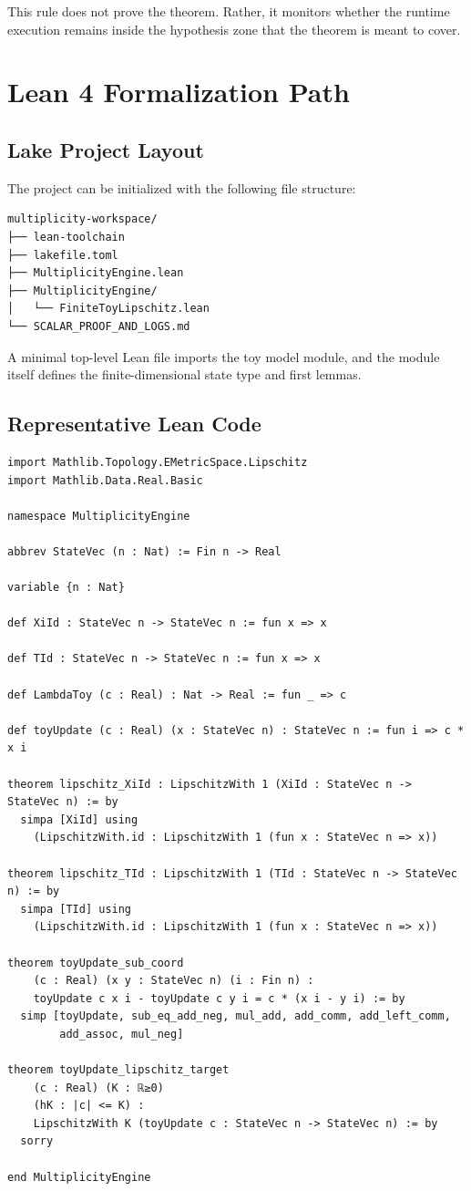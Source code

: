 \documentclass[11pt]{article}
\begin{document}
This rule does not prove the theorem. Rather, it monitors whether the runtime execution remains inside the hypothesis zone that the theorem is meant to cover.

\section{Lean 4 Formalization Path}

\subsection{Lake Project Layout}
The project can be initialized with the following file structure:
\begin{verbatim}
multiplicity-workspace/
├── lean-toolchain
├── lakefile.toml
├── MultiplicityEngine.lean
├── MultiplicityEngine/
│   └── FiniteToyLipschitz.lean
└── SCALAR_PROOF_AND_LOGS.md
\end{verbatim}

A minimal top-level Lean file imports the toy model module, and the module itself defines the finite-dimensional state type and first lemmas.

\subsection{Representative Lean Code}
\begin{verbatim}
import Mathlib.Topology.EMetricSpace.Lipschitz
import Mathlib.Data.Real.Basic

namespace MultiplicityEngine

abbrev StateVec (n : Nat) := Fin n -> Real

variable {n : Nat}

def XiId : StateVec n -> StateVec n := fun x => x

def TId : StateVec n -> StateVec n := fun x => x

def LambdaToy (c : Real) : Nat -> Real := fun _ => c

def toyUpdate (c : Real) (x : StateVec n) : StateVec n := fun i => c * x i

theorem lipschitz_XiId : LipschitzWith 1 (XiId : StateVec n -> StateVec n) := by
  simpa [XiId] using
    (LipschitzWith.id : LipschitzWith 1 (fun x : StateVec n => x))

theorem lipschitz_TId : LipschitzWith 1 (TId : StateVec n -> StateVec n) := by
  simpa [TId] using
    (LipschitzWith.id : LipschitzWith 1 (fun x : StateVec n => x))

theorem toyUpdate_sub_coord
    (c : Real) (x y : StateVec n) (i : Fin n) :
    toyUpdate c x i - toyUpdate c y i = c * (x i - y i) := by
  simp [toyUpdate, sub_eq_add_neg, mul_add, add_comm, add_left_comm,
        add_assoc, mul_neg]

theorem toyUpdate_lipschitz_target
    (c : Real) (K : ℝ≥0)
    (hK : |c| <= K) :
    LipschitzWith K (toyUpdate c : StateVec n -> StateVec n) := by
  sorry

end MultiplicityEngine
\end{verbatim}
\end{document}
